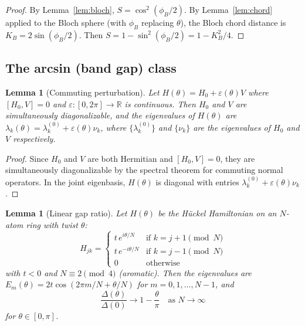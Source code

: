 \documentclass[11pt,letterpaper]{article}
\newtheorem{lemma}[theorem]{Lemma}
\begin{document}
\begin{proof}
By Lemma~\ref{lem:bloch}, $S = \cos^2(\phi_B/2)$. By Lemma~\ref{lem:chord} applied to the Bloch sphere (with $\phi_B$ replacing $\theta$), the Bloch chord distance is $K_B = 2\sin(\phi_B/2)$. Then $S = 1 - \sin^2(\phi_B/2) = 1 - K_B^2/4$.
\end{proof}


\subsection{The arcsin (band gap) class}

\begin{lemma}[Commuting perturbation]\label{lem:commuting}
Let $H(\theta) = H_0 + \varepsilon(\theta) V$ where $[H_0, V] = 0$ and $\varepsilon: [0, 2\pi] \to \mathbb{R}$ is continuous. Then $H_0$ and $V$ are simultaneously diagonalizable, and the eigenvalues of $H(\theta)$ are $\lambda_k(\theta) = \lambda_k^{(0)} + \varepsilon(\theta)\nu_k$, where $\{\lambda_k^{(0)}\}$ and $\{\nu_k\}$ are the eigenvalues of $H_0$ and $V$ respectively.
\end{lemma}

\begin{proof}
Since $H_0$ and $V$ are both Hermitian and $[H_0, V] = 0$, they are simultaneously diagonalizable by the spectral theorem for commuting normal operators. In the joint eigenbasis, $H(\theta)$ is diagonal with entries $\lambda_k^{(0)} + \varepsilon(\theta)\nu_k$.
\end{proof}

\begin{lemma}[Linear gap ratio]\label{lem:lingap}
Let $H(\theta)$ be the H\"uckel Hamiltonian on an $N$-atom ring with twist $\theta$:
\begin{equation}
H_{jk} = \begin{cases} t\,e^{i\theta/N} & \text{if } k = j+1 \pmod{N} \\ t\,e^{-i\theta/N} & \text{if } k = j-1 \pmod{N} \\ 0 & \text{otherwise} \end{cases}
\end{equation}
with $t < 0$ and $N \equiv 2 \pmod{4}$ (aromatic). Then the eigenvalues are $E_m(\theta) = 2t\cos(2\pi m/N + \theta/N)$ for $m = 0, 1, \ldots, N-1$, and
\begin{equation}
\frac{\Delta(\theta)}{\Delta(0)} \to 1 - \frac{\theta}{\pi} \quad \text{as } N \to \infty
\end{equation}
for $\theta \in [0, \pi]$.
\end{lemma}
\end{document}
